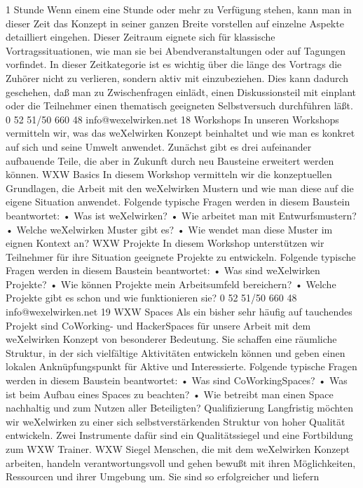 1 Stunde
Wenn einem eine Stunde oder mehr zu Verfügung stehen, kann man in dieser Zeit das Konzept in seiner 
ganzen Breite vorstellen auf einzelne Aspekte detailliert eingehen. Dieser Zeitraum eignete sich für 
klassische Vortragssituationen, wie man sie bei Abendveranstaltungen oder auf Tagungen vorfindet.
In dieser Zeitkategorie ist es wichtig über die länge des Vortrags die Zuhörer nicht zu verlieren, 
sondern aktiv mit einzubeziehen. Dies kann dadurch geschehen, daß man zu Zwischenfragen einlädt, 
einen Diskussionsteil mit einplant oder die Teilnehmer einen thematisch geeigneten Selbstversuch 
durchführen läßt. 
0 52 51/50 660 48
info@wexelwirken.net
18
Workshops
In unseren Workshops vermitteln wir, was das weXelwirken Konzept beinhaltet und wie man es konkret 
auf sich und seine Umwelt anwendet. Zunächst gibt es drei aufeinander aufbauende Teile, die aber in 
Zukunft durch neu Bausteine erweitert werden können.
WXW Basics
In diesem Workshop vermitteln wir die konzeptuellen Grundlagen, die Arbeit mit den weXelwirken 
Mustern und wie man diese auf die eigene Situation anwendet. Folgende typische Fragen werden in 
diesem Baustein beantwortet:
•
Was ist weXelwirken?
•
Wie arbeitet man mit Entwurfsmustern?
•
Welche weXelwirken Muster gibt es?
•
Wie wendet man diese Muster im eignen Kontext an?
WXW Projekte
In diesem Workshop unterstützen wir Teilnehmer für ihre Situation geeignete Projekte zu entwickeln. 
Folgende typische Fragen werden in diesem Baustein beantwortet:
•
Was sind weXelwirken Projekte?
•
Wie können Projekte mein Arbeitsumfeld bereichern?
•
Welche Projekte gibt es schon und wie funktionieren sie?
0 52 51/50 660 48
info@wexelwirken.net
19
WXW Spaces
Als ein bisher sehr häufig auf tauchendes Projekt sind CoWorking- und HackerSpaces für unsere Arbeit 
mit dem weXelwirken Konzept von besonderer Bedeutung. Sie schaffen eine räumliche Struktur, in der 
sich vielfältige Aktivitäten entwickeln können und geben einen lokalen Anknüpfungspunkt für Aktive 
und Interessierte. Folgende typische Fragen werden in diesem Baustein beantwortet:
•
Was sind CoWorkingSpaces?
•
Was ist beim Aufbau eines Spaces zu beachten?
•
Wie betreibt man einen Space nachhaltig und zum Nutzen aller Beteiligten?
Qualifizierung
Langfristig möchten wir weXelwirken zu einer sich selbstverstärkenden Struktur von hoher Qualität 
entwickeln. Zwei Instrumente dafür sind ein Qualitätssiegel und eine Fortbildung zum WXW Trainer.
WXW Siegel
Menschen, die mit dem weXelwirken Konzept arbeiten, handeln verantwortungsvoll und gehen bewußt 
mit ihren Möglichkeiten, Ressourcen und ihrer Umgebung um. Sie sind so erfolgreicher und liefern 
